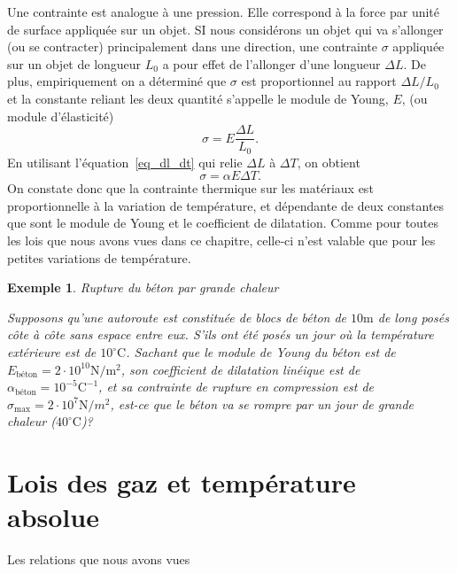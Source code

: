 \documentclass[a4paper,12pt]{book}
\newtheorem*{exemple}{Exemple}
\newcommand{\m}{\mathrm{m}}
\newcommand{\C}{\mathrm{C}}
\newcommand{\N}{\mathrm{N}}
\begin{document}
Une contrainte est analogue à une pression. Elle correspond à la
force par unité de surface appliquée sur un objet.
SI nous considérons un objet qui va s'allonger (ou se contracter) principalement dans une direction, une contrainte $\sigma$ appliquée sur un objet de longueur $L_0$ a pour effet de l'allonger d'une longueur $\Delta L$. De plus, 
empiriquement on a déterminé que $\sigma$ est proportionnel 
au rapport $\Delta L/L_0$ et la constante reliant les deux quantité s'appelle le module de Young, $E$, (ou module d'élasticité)
\begin{equation}
\sigma=E\frac{\Delta L}{L_0}.
\end{equation}
En utilisant l'équation~\eqref{eq_dl_dt} qui relie $\Delta L$ à $\Delta T$, on obtient
\begin{equation}
\sigma=\alpha E \Delta T.
\end{equation}
On constate donc que la contrainte thermique sur les matériaux est proportionnelle à la variation de température, et dépendante 
de deux constantes que sont le module de Young et le coefficient de dilatation. Comme pour toutes les lois que nous avons vues dans ce chapitre, celle-ci n'est valable que pour les petites variations de température.
\begin{exemple}{Rupture du béton par grande chaleur}

Supposons qu'une autoroute est constituée de blocs de béton
de $10\m$ de long posés côte à côte sans espace entre eux. S'ils ont été posés un jour où la température extérieure est de $10^\circ\C$. Sachant que le module de Young du béton est de $E_{\mbox{béton}}=2\cdot10^{10}\N/\m^2$, 
son coefficient de dilatation linéique est de $\alpha_{\mbox{béton}}=10^{-5}\C^{-1}$, et sa contrainte de rupture en compression est de $\sigma_{\mbox{max}}=2\cdot 10^7 \N/m^2$, est-ce que le béton 
va se rompre par un jour de grande chaleur ($40^\circ\C$)?
\end{exemple}

\section{Lois des gaz et température absolue}

Les relations que nous avons vues 
\end{document}
